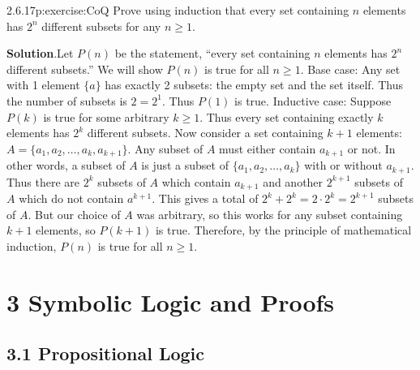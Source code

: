 \documentclass[twoside,11pt,]{book}
\newcommand{\blocktitlefont}{\relax}
\numberwithin{equation}{chapter}
\begin{document}
\begin{divisionsolution}{2.6.17}{}{p:exercise:CoQ}%
Prove using induction that every set containing \(n\) elements has \(2^n\) different subsets for any \(n \ge 1\).%
\par\smallskip%
\noindent\textbf{\blocktitlefont Solution}.\quad{}Let \(P(n)\) be the statement, ``every set containing \(n\) elements has \(2^n\) different subsets.'' We will show \(P(n)\) is true for all \(n \ge 1\). Base case: Any set with 1 element \(\{a\}\) has exactly 2 subsets: the empty set and the set itself. Thus the number of subsets is \(2= 2^1\). Thus \(P(1)\) is true. Inductive case: Suppose \(P(k)\) is true for some arbitrary \(k \ge 1\). Thus every set containing exactly \(k\) elements has \(2^k\) different subsets. Now consider a set containing \(k+1\) elements: \(A = \{a_1, a_2, \ldots, a_k, a_{k+1}\}\). Any subset of \(A\) must either contain \(a_{k+1}\) or not. In other words, a subset of \(A\) is just a subset of \(\{a_1, a_2,\ldots,
a_k\}\) with or without \(a_{k+1}\). Thus there are \(2^k\) subsets of \(A\) which contain \(a_{k+1}\) and another \(2^{k+1}\) subsets of \(A\) which do not contain \(a^{k+1}\). This gives a total of \(2^k + 2^k = 2\cdot 2^k = 2^{k+1}\) subsets of \(A\). But our choice of \(A\) was arbitrary, so this works for any subset containing \(k+1\) elements, so \(P(k+1)\) is true. Therefore, by the principle of mathematical induction, \(P(n)\) is true for all \(n \ge 1\).%
\end{divisionsolution}%
\chapter*{3 Symbolic Logic and Proofs}
\section*{3.1 Propositional Logic}
\end{document}
